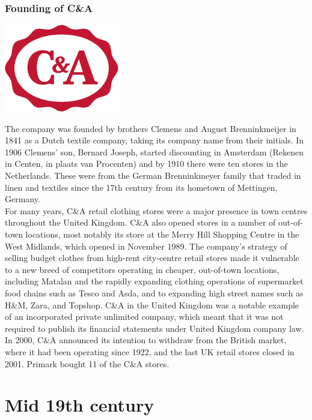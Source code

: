 \documentclass[11pt]{report}
\begin{document}
\subsection{Founding of C\&A}
\vspace{2mm}\begin{center}\includegraphics[width=5cm]{./img/c&aLogo.jpg}\end{center}
The company was founded by brothers Clemens and August Brenninkmeijer in 1841 as a Dutch textile company, taking its company name from their initials. In 1906 Clemens' son, Bernard Joseph, started discounting in Amsterdam (Rekenen in Centen, in plaats van Procenten) and by 1910 there were ten stores in the Netherlands. These were from the German Brenninkmeyer family that traded in linen and textiles since the 17th century from its hometown of Mettingen, Germany.\\
For many years, C\&A retail clothing stores were a major presence in town centres throughout the United Kingdom. C\&A also opened stores in a number of out-of-town locations, most notably its store at the Merry Hill Shopping Centre in the West Midlands, which opened in November 1989. The company's strategy of selling budget clothes from high-rent city-centre retail stores made it vulnerable to a new breed of competitors operating in cheaper, out-of-town locations, including Matalan and the rapidly expanding clothing operations of supermarket food chains such as Tesco and Asda, and to expanding high street names such as H\&M, Zara, and Topshop. C\&A in the United Kingdom was a notable example of an incorporated private unlimited company, which meant that it was not required to publish its financial statements under United Kingdom company law. In 2000, C\&A announced its intention to withdraw from the British market, where it had been operating since 1922, and the last UK retail stores closed in 2001. Primark bought 11 of the C\&A stores.

\chapter{Mid 19th century}
\section{}
\end{document}
